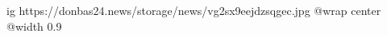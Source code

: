  
 
 
 
 

\ifcmt
  ig https://donbas24.news/storage/news/vg2sx9eejdzsqgec.jpg
  @wrap center
  @width 0.9
\fi
